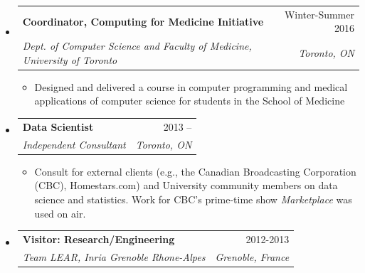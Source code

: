 \documentclass[letterpaper,11pt]{article}
\makeatletter
\newcommand{\ressubheading}[4]{
\begin{tabular*}{\linewidth}[t]{l@{\extracolsep{\fill}}r}
		\textbf{#1} & #2 \\
		\textit{\textcolor{accent}{#3}} & \textit{#4} \\
\end{tabular*}\vspace{-2pt}}
\makeatother
\begin{document}
\begin{itemize}
\item
	\ressubheading{Coordinator, Computing for Medicine Initiative}{Winter-Summer 2016}{Dept. of Computer Science and Faculty of Medicine, University of Toronto}{Toronto, ON}
	\begin{itemize}
		\item Designed and delivered a course in computer programming and medical applications of computer science for students in the School of Medicine
	\end{itemize}

\item
	\ressubheading{Data Scientist}{2013 -- }{Independent Consultant}{Toronto, ON}
	\begin{itemize}
		\item Consult for external clients (e.g., the Canadian Broadcasting Corporation (CBC), Homestars.com) and University community members on data science and statistics. Work for CBC's prime-time show \textit{Marketplace} was used on air.	
	\end{itemize}

\item	
	\ressubheading{Visitor: Research/Engineering}{2012-2013}{Team LEAR, Inria Grenoble Rhone-Alpes}{Grenoble, France}


\end{itemize}
\end{document}

